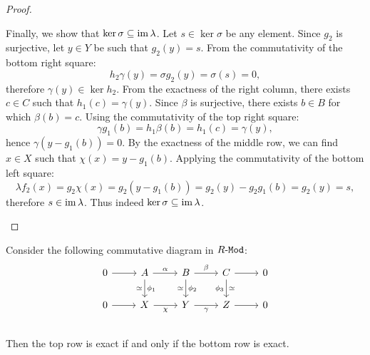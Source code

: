 \begin{proof}
\begin{enumerate}[(a)]
  Finally, we show that \(\ker \sigma \subseteq \operatorname{im} \lambda\). Let
  \(s \in \ker\sigma\) be any element. Since \(g_2\) is surjective, let
  \(y \in Y\) be such that \(g_2(y) = s\). From the commutativity of the bottom
  right square:
  \[
  h_2 \gamma(y) = \sigma g_2(y) = \sigma(s) = 0,
  \]
  therefore \(\gamma(y) \in \ker h_2\). From the exactness of the right column,
  there exists \(c \in C\) such that \(h_1(c) = \gamma(y)\). Since \(\beta\) is
  surjective, there exists \(b \in B\) for which \(\beta(b) = c\). Using the
  commutativity of the top right square:
  \[
  \gamma g_1(b) = h_1 \beta(b) = h_1(c) = \gamma(y),
  \]
  hence \(\gamma(y - g_1(b)) = 0\). By the exactness of the middle row, we can
  find \(x \in X\) such that \(\chi(x) = y - g_1(b)\). Applying the
  commutativity of the bottom left square:
  \[
  \lambda f_2(x) = g_2 \chi(x)
  = g_2(y - g_1(b)) = g_2(y) - g_2 g_1(b) = g_2(y) = s,
  \]
  therefore \(s \in \operatorname{im} \lambda\). Thus indeed
  \(\ker \sigma \subseteq \operatorname{im} \lambda\).
\end{enumerate}
\end{proof}

\begin{proposition}
\label{prop:top-exact-iff-bottom-exact}
Consider the following commutative diagram in \({R\text{-}\texttt{Mod}}\):
\[
\begin{tikzcd}
0 \ar[r]
&A \ar[r, "\alpha"] \ar[d, "\dis"', "\phi_1"]
&B \ar[r, "\beta"]  \ar[d, "\dis"', "\phi_2"]
&C \ar[r]           \ar[d, "\dis", "\phi_3"']
&0 \\
0 \ar[r]
&X \ar[r, "\chi"']
&Y \ar[r, "\gamma"']
&Z \ar[r]
&0 \\
\end{tikzcd}
\]
Then the top row is exact if and only if the bottom row is exact.
\end{proposition}

